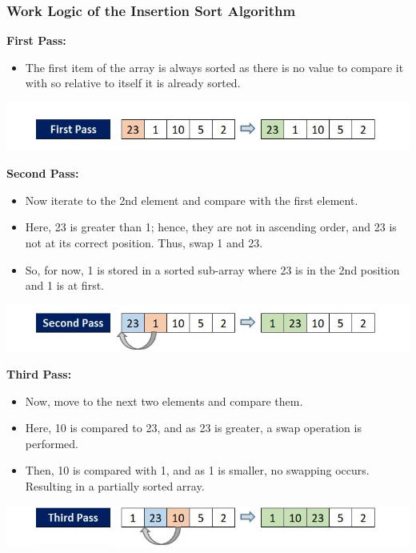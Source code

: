 \documentclass[a4paper,12pt,twocolumn]{article}
\begin{document}
\subsubsection*{Work Logic of the Insertion Sort Algorithm}
\hspace{2.7mm}
\textbf{First Pass:}
\begin{itemize}
    \item The first item of the array is always sorted as there is no value to compare it with so relative to itself it is already sorted.
\end{itemize}
\begin{center}

    \includegraphics[width=\linewidth]{pass1.jpg}
    \label{fig:pass1}
\end{center}
\textbf{Second Pass:}
\begin{itemize}
    \item Now iterate to the 2nd element and compare with the first element.
    \item Here, 23 is greater than 1; hence, they are not in ascending order, and 23 is not at its correct position. Thus, swap 1 and 23.
    \item So, for now, 1 is stored in a sorted sub-array where 23 is in the 2nd position and 1 is at first.
\end{itemize}
\begin{center}
    \includegraphics[width=\linewidth]{pass2.jpg}
    \label{fig:pass2}
\end{center}
\textbf{Third Pass:}
\begin{itemize}
    \item Now, move to the next two elements and compare them.
    \item Here, 10 is compared to 23, and as 23 is greater, a swap operation is performed.
    \item Then, 10 is compared with 1, and as 1 is smaller, no swapping occurs. Resulting in a partially sorted array.
\end{itemize}
\begin{center}
    \includegraphics[width=\linewidth]{pass3.jpg}
    \label{fig:pass3}
\end{center}
\end{document}
